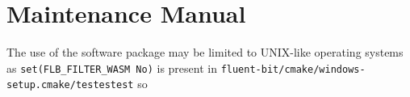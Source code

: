 \chapter{Maintenance Manual\label{chap:maintenance_man}}



The use of the software package may be limited to UNIX-like operating systems as \newline\texttt{set(FLB_FILTER_WASM           No)} is present in \texttt{fluent-bit/cmake/windows-setup.cmake/testestest} so
